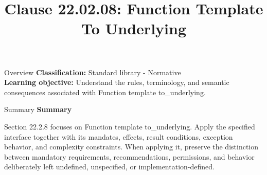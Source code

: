 \documentclass[10pt,letterpaper]{article}
\title{Clause 22.02.08: Function Template To Underlying}
\author{}
\date{}
\begin{document}
\maketitle
\begin{CornellOverviewBox}{Overview}
\textbf{Classification:} Standard library - Normative\\[2pt]
\textbf{Learning objective:} Understand the rules, terminology, and semantic consequences associated with Function template to\_underlying.
\end{CornellOverviewBox}\begin{CornellSummaryBox}{Summary}
{\sffamily\bfseries\color{Accent} Summary}\par\vspace{3pt}Section 22.2.8 focuses on Function template to\_underlying. Apply the specified interface together with its mandates, effects, result conditions, exception behavior, and complexity constraints. When applying it, preserve the distinction between mandatory requirements, recommendations, permissions, and behavior deliberately left undefined, unspecified, or implementation-defined.
\end{CornellSummaryBox}
\end{document}
